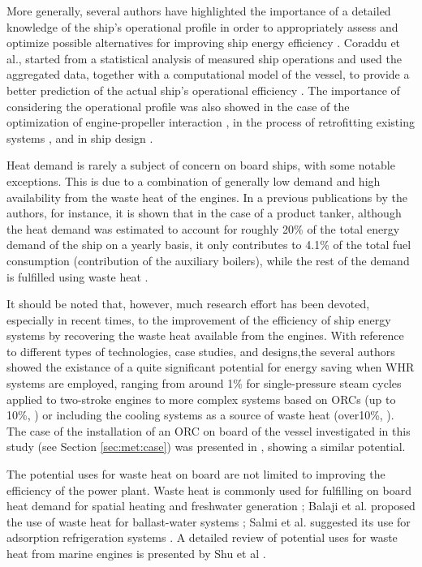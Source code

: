 \documentclass[preprint,12pt]{elsarticle}
\begin{document}
More generally, several authors have highlighted the importance of a detailed knowledge of the ship's operational profile in order to appropriately assess and optimize possible alternatives for improving ship energy efficiency \cite{Banks2013}. Coraddu et al., started from a statistical analysis of measured ship operations and used the aggregated data, together with a computational model of the vessel, to provide a better prediction of the actual ship's operational efficiency \cite{Coraddu2014}. The importance of considering the operational profile was also showed in the case of the optimization of engine-propeller interaction \cite{Baldi2015c}, in the process of retrofitting existing systems \cite{Baldi2015b,Choi2013}, and in ship design \cite{Ghassemi2017,Solem2015}. 

Heat demand is rarely a subject of concern on board ships, with some notable exceptions. This is due to a combination of generally low demand and high availability from the waste heat of the engines. In a previous publications by the authors, for instance, it is shown that in the case of a product tanker, although the heat demand was estimated to account for roughly 20\% of the total energy demand of the ship on a yearly basis, it only contributes to 4.1\% of the total fuel consumption (contribution of the auxiliary boilers), while the rest of the demand is fulfilled using waste heat \cite{Baldi2015a}.

It should be noted that, however, much research effort has been devoted, especially in recent times, to the improvement of the efficiency of ship energy systems by recovering the waste heat available from the engines. With reference to different types of technologies, case studies, and designs,the several authors showed the existance of a quite significant potential for energy saving when WHR systems are employed, ranging from around 1\% for single-pressure steam cycles applied to two-stroke engines \cite{Theotokatos2012} to more complex systems based on ORCs (up to 10\%, \cite{Hountalas2012}) or including the cooling systems as a source of waste heat (over10\%, \cite{Dimopoulos2012}).  The case of the installation of an ORC on board of the vessel investigated in this study (see Section \ref{sec:met:case}) was presented in \cite{Mondejar2015}, showing a similar potential.

The potential uses for waste heat on board are not limited to improving the efficiency of the power plant. Waste heat is commonly used for fulfilling on board heat demand for spatial heating and freshwater generation \cite{Molland2011,Baldi2015a,Mccarthy1990};  Balaji et al. proposed the use of waste heat for ballast-water systems \cite{Balaji2012}; Salmi et al. suggested its use for adsorption refrigeration systems \cite{Salmi2017}. A detailed review of potential uses for waste heat from marine engines is presented by Shu et al \cite{Shu2013}. 
\end{document}
